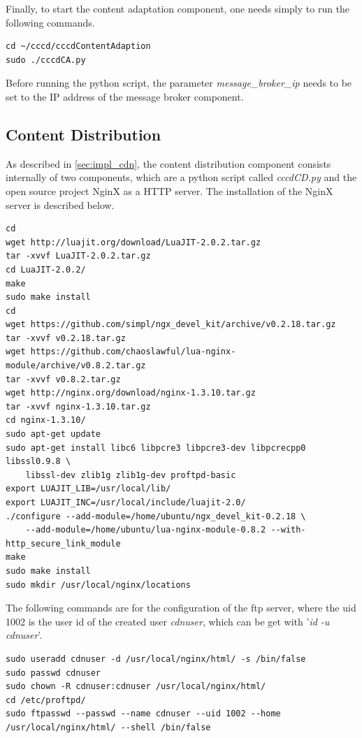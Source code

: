 Finally, to start the content adaptation component, one needs simply to run the following commands.

\begin{code}
\begin{verbatim}
cd ~/cccd/cccdContentAdaption
sudo ./cccdCA.py
\end{verbatim}
\end{code}

Before running the python script, the parameter \textit{message\_broker\_ip} needs to be set to the IP address of the message broker component.

\subsection{Content Distribution\label{sec:eval_te_cd}}
As described in \ref{sec:impl_cdn}, the content distribution component consists internally of two components, which are a python script called \textit{cccdCD.py} and the open source project NginX as a \ac{HTTP} server. The installation of the NginX server is described below.

\begin{code}
\begin{verbatim}
cd
wget http://luajit.org/download/LuaJIT-2.0.2.tar.gz
tar -xvvf LuaJIT-2.0.2.tar.gz
cd LuaJIT-2.0.2/
make
sudo make install
cd
wget https://github.com/simpl/ngx_devel_kit/archive/v0.2.18.tar.gz
tar -xvvf v0.2.18.tar.gz
wget https://github.com/chaoslawful/lua-nginx-module/archive/v0.8.2.tar.gz
tar -xvvf v0.8.2.tar.gz
wget http://nginx.org/download/nginx-1.3.10.tar.gz
tar -xvvf nginx-1.3.10.tar.gz
cd nginx-1.3.10/
sudo apt-get update
sudo apt-get install libc6 libpcre3 libpcre3-dev libpcrecpp0 libssl0.9.8 \
	libssl-dev zlib1g zlib1g-dev proftpd-basic
export LUAJIT_LIB=/usr/local/lib/
export LUAJIT_INC=/usr/local/include/luajit-2.0/
./configure --add-module=/home/ubuntu/ngx_devel_kit-0.2.18 \
	--add-module=/home/ubuntu/lua-nginx-module-0.8.2 --with-http_secure_link_module
make
sudo make install
sudo mkdir /usr/local/nginx/locations
\end{verbatim}
\end{code}

The following commands are for the configuration of the ftp server, where the uid 1002 is the user id of the created user \textit{cdnuser}, which can be get with '\textit{id -u cdnuser}'.
\begin{code}
\begin{verbatim}
sudo useradd cdnuser -d /usr/local/nginx/html/ -s /bin/false
sudo passwd cdnuser
sudo chown -R cdnuser:cdnuser /usr/local/nginx/html/
cd /etc/proftpd/
sudo ftpasswd --passwd --name cdnuser --uid 1002 --home /usr/local/nginx/html/ --shell /bin/false
\end{verbatim}
\end{code}

